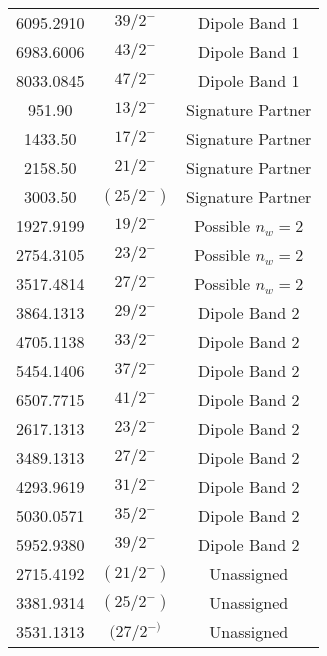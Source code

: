 \begin{center}
\begin{longtable}{|c|c|c|}
 6095.2910 &$ 39/2^{-} $& Dipole Band 1 \\
 6983.6006 &$ 43/2^{-} $& Dipole Band 1 \\
 8033.0845 &$ 47/2^{-} $& Dipole Band 1 \\
 951.90 &$ 13/2^{-} $& Signature Partner \\
 1433.50 &$ 17/2^{-} $& Signature Partner \\
 2158.50 &$ 21/2^{-} $& Signature Partner \\
 3003.50 &$ (25/2^{-}) $& Signature Partner \\
 1927.9199 &$ 19/2^{-} $& Possible $n_w=2$ \\
 2754.3105 &$ 23/2^{-} $& Possible $n_w=2$ \\
 3517.4814 &$ 27/2^{-} $& Possible $n_w=2$ \\
 3864.1313 &$ 29/2^{-} $& Dipole Band 2 \\
 4705.1138 &$ 33/2^{-} $& Dipole Band 2 \\
 5454.1406 &$ 37/2^{-} $& Dipole Band 2 \\
 6507.7715 &$ 41/2^{-} $& Dipole Band 2 \\
 2617.1313 &$ 23/2^{-} $& Dipole Band 2 \\
 3489.1313 &$ 27/2^{-} $& Dipole Band 2 \\
 4293.9619 &$ 31/2^{-} $& Dipole Band 2 \\
 5030.0571 &$ 35/2^{-} $& Dipole Band 2 \\
 5952.9380 &$ 39/2^{-} $& Dipole Band 2 \\
 2715.4192 &$ (21/2^{-}) $& Unassigned \\
 3381.9314 &$ (25/2^{-}) $& Unassigned \\
 3531.1313 &$ (27/2^{-)} $& Unassigned \\
\end{longtable}
\end{center}


